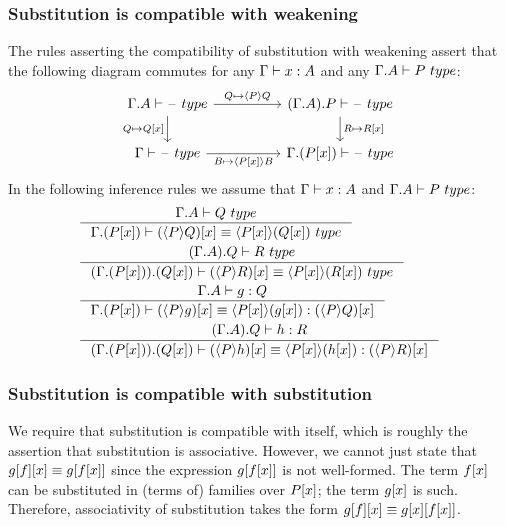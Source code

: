 \subsubsection{Substitution is compatible with weakening}
The rules asserting the compatibility of substitution with weakening assert
that the following diagram commutes for any $\jterm{\Gamma}{A}{x}$ and any
$\jtype{\ctxext{\Gamma}{A}}{P}$:
\begin{equation*}
\begin{tikzcd}[column sep=huge]
\jtype{\ctxext{\Gamma}{A}}{\blank} \ar{d}[swap]{Q\mapsto\subst{x}{Q}} \ar{r}{Q\mapsto\ctxwk{P}{Q}} & \jtype{\ctxext{{\Gamma}{A}}{P}}{\blank} \ar{d}{R\mapsto\subst{x}{R}}\\ 
\jtype{\Gamma}{\blank} \ar{r}[swap]{B\mapsto\ctxwk{\subst{x}{P}}{B}} & \jtype{\ctxext{\Gamma}{\subst{x}{P}}}{\blank}
\end{tikzcd}
\end{equation*}
In the following inference rules we assume that $\jterm{\Gamma}{A}{x}$ and
$\jtype{\ctxext{\Gamma}{A}}{P}$:
\begin{align}
& \inference
    {\jtype{\ctxext{\Gamma}{A}}{Q}}
    {\jtypeeq{\ctxext{\Gamma}{\subst{x}{P}}}{\subst{x}{\ctxwk{P}{Q}}}{\ctxwk{\subst{x}{P}}{\subst{x}{Q}}}}\\
& \inference
    {\jtype{\ctxext{{\Gamma}{A}}{Q}}{R}}
    {\jtypeeq{\ctxext{{\Gamma}{\subst{x}{P}}}{\subst{x}{Q}}}{\subst{x}{\ctxwk{P}{R}}}{\ctxwk{\subst{x}{P}}{\subst{x}{R}}}}\\
& \inference
    {\jterm{\ctxext{\Gamma}{A}}{Q}{g}}
    {\jtermeq
      {\ctxext{\Gamma}{\subst{x}{P}}}
      {\subst{x}{\ctxwk{P}{Q}}}
      {\subst{x}{\ctxwk{P}{g}}}
      {\ctxwk{\subst{x}{P}}{\subst{x}{g}}}}\\
& \inference
    {\jterm{\ctxext{{\Gamma}{A}}{Q}}{R}{h}}
    {\jtermeq
      {\ctxext{{\Gamma}{\subst{x}{P}}}{\subst{x}{Q}}}
      {\subst{x}{\ctxwk{P}{R}}}
      {\subst{x}{\ctxwk{P}{h}}}
      {\ctxwk{\subst{x}{P}}{\subst{x}{h}}}}
\end{align}

\subsubsection{Substitution is compatible with substitution}

We require that substitution is compatible with itself, which is roughly the
assertion that substitution is associative. However, we cannot just state that
$\subst{x}{{f}{g}}\jdeq\subst{{x}{f}}{g}$ since the expression $\subst{{x}{f}}{g}$
is not well-formed. The term $\subst{x}{f}$ can be substituted in (terms of) families over
$\subst{x}{P}$; the term $\subst{x}{g}$ is such. Therefore, associativity of
substitution takes the form $\subst{x}{{f}{g}}\jdeq\subst{{x}{f}}{{x}{g}}$.

